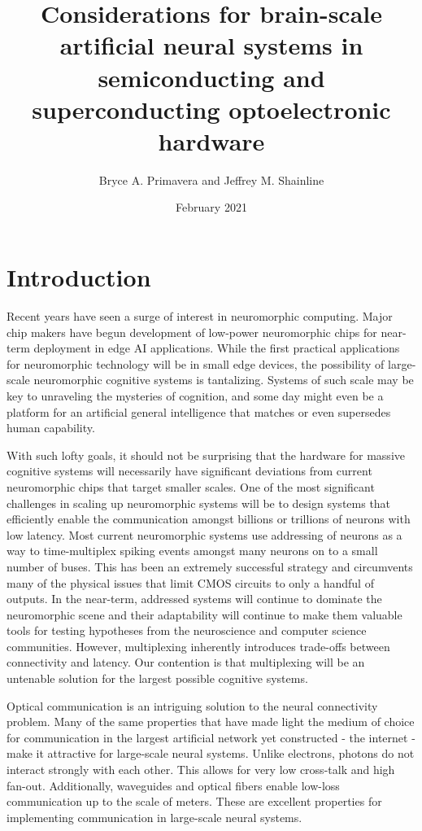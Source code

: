 \documentclass[twocolumn]{article}
\title{\textcolor{OliveGreen}{Considerations for brain-scale artificial neural systems in semiconducting and superconducting optoelectronic hardware}}
\author{Bryce A. Primavera and Jeffrey M. Shainline}
\date{February 2021}
\begin{document}
\maketitle
\begin{abstract}
\end{abstract}

\setcounter{tocdepth}{4}
\setcounter{secnumdepth}{4}
\tableofcontents

\section{\label{sec:introduction}Introduction}

\quad \quad Recent years have seen a surge of interest in neuromorphic computing. Major chip makers have begun development of low-power neuromorphic chips for near-term deployment in edge AI applications.\cite{merolla2014million, davies2018loihi} While the first practical applications for neuromorphic technology will be in small edge devices, the possibility of large-scale neuromorphic cognitive systems is tantalizing. Systems of such scale may be key to unraveling the mysteries of cognition, and some day might even be a platform for an artificial general intelligence that matches or even supersedes human capability.

With such lofty goals, it should not be surprising that the hardware for massive cognitive systems will necessarily have significant deviations from current neuromorphic chips that target smaller scales. One of the most significant challenges in scaling up neuromorphic systems will be to design systems that efficiently enable the communication amongst billions or trillions of neurons with low latency. Most current neuromorphic systems use addressing of neurons as a way to time-multiplex spiking events amongst many neurons on to a small number of buses. This has been an extremely successful strategy and circumvents many of the physical issues that limit CMOS circuits to only a handful of outputs. In the near-term, addressed systems will continue to dominate the neuromorphic scene and their adaptability will continue to make them valuable tools for testing hypotheses from the neuroscience and computer science communities. However, multiplexing inherently introduces trade-offs between connectivity and latency. Our contention is that multiplexing will be an untenable solution for the largest possible cognitive systems.

Optical communication is an intriguing solution to the neural connectivity problem. Many of the same properties that have made light the medium of choice for communication in the largest artificial network yet constructed - the internet - make it attractive for large-scale neural systems. Unlike electrons, photons do not interact strongly with each other. This allows for very low cross-talk and high fan-out. Additionally, waveguides and optical fibers enable low-loss communication up to the scale of meters. These are excellent properties for implementing communication in large-scale neural systems. 
\end{document}

